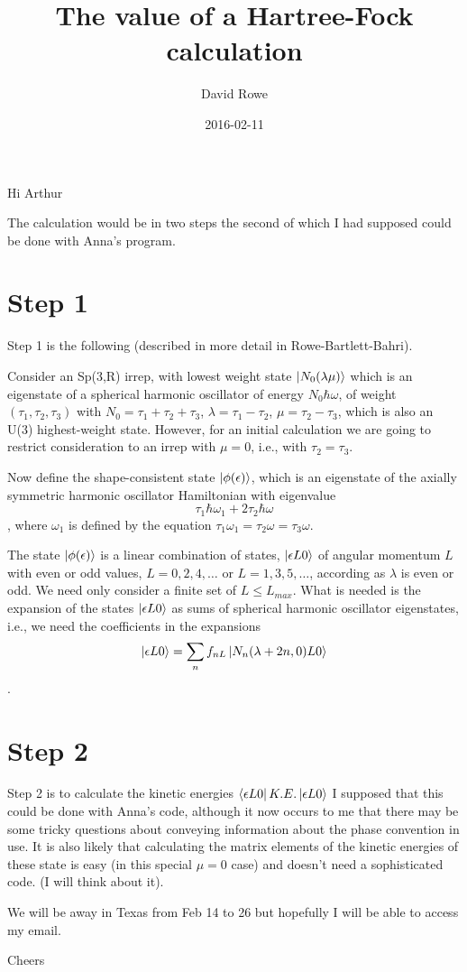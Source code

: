 \documentclass[11pt]{amsart}
\title{The value of a Hartree-Fock calculation}
\author{David Rowe}
\date{2016-02-11}                                           %
\begin{document}
\maketitle

Hi Arthur

The calculation would be in two steps the second of which I had supposed could be done with Anna's program.

\section{Step 1}

Step 1 is the following (described in more detail in Rowe-Bartlett-Bahri).

Consider an Sp(3,R) irrep, with lowest weight state $\Ket{N_0(\lambda\mu)}$
which is an eigenstate of a spherical harmonic oscillator of energy 
$N_0 \hbar\omega$, of weight $(\tau_1,\tau_2,\tau_3)$
with 
$N_0 =  \tau_1 + \tau_2 + \tau_3$, 
$\lambda= \tau_1 - \tau_2$, 
$\mu = \tau_2 - \tau_3$,
which is also an U(3)  highest-weight state.
However, for an initial calculation we are going to restrict consideration to an irrep with $\mu=0$, i.e., with $\tau_2=\tau_3$.

Now define the shape-consistent state  $\Ket{\phi(\epsilon)}$, which is an eigenstate of the  axially symmetric harmonic oscillator Hamiltonian  with eigenvalue
$$\tau_1 \hbar\omega_1 + 2\tau_2 \hbar\omega$$, where $\omega_1$ is defined by the equation
$\tau_1\omega_1 = \tau_2\omega = \tau_3\omega$.


The state  $\Ket{\phi(\epsilon)}$ is a linear combination of  states, 
$\Ket{\epsilon L 0}$ of angular momentum $L$ with even or odd values, 
$L= 0,2,4,\ldots$ or $L=1,3,5,\ldots$, according as $\lambda$ is even or odd.
We need only consider  a finite set of $L \leq L_{max}$.
What is needed is the expansion of the states $\Ket{\epsilon L 0}$ as sums of spherical harmonic oscillator eigenstates, i.e., we need the coefficients in the expansions
$$\Ket{\epsilon L 0} = \sum_n f_{nL} \Ket{N_n (\lambda+2n,0) L 0}$$.

\section{Step 2}

Step 2 is to calculate the kinetic energies
$\Bra{\epsilon L 0} K.E. \Ket{\epsilon L 0}$
I supposed that this could be done with Anna's code, although it now occurs to me that there may be some tricky questions about conveying information about the phase convention  in use.  It is also likely that calculating the matrix elements of the kinetic energies of these state is easy (in this special $\mu = 0$ case) and doesn't need a sophisticated code. (I will think about it).

We will be away in Texas from Feb 14 to 26 but hopefully I will be able to access my email.

Cheers
\end{document}
